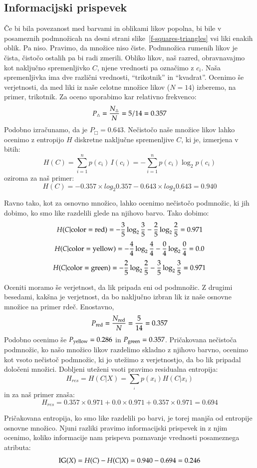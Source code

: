 \subsection{Informacijski prispevek}

Če bi bila povezanost med barvami in oblikami likov popolna, bi bile v posameznih podmnožicah na desni strani slike~\ref{f-squares-triangles} vsi liki enakih oblik. Pa niso. Pravimo, da množice niso čiste. Podmnožica rumenih likov je čista, čistočo ostalih pa bi radi zmerili. Obliko likov, naš razred, obravnavajmo kot naključno spremenljivko $C$, njene vrednosti pa označimo z $c_i$. Naša spremenljivka ima dve različni vrednosti, ``trikotnik'' in ``kvadrat''. Ocenimo še verjetnosti, da med liki iz naše celotne množice likov ($N=14$) izberemo, na primer, trikotnik. Za oceno uporabimo kar relativno frekvenco:
%
$$ P_{\triangle}={N_{\triangle} \over N} = 5/14 = 0.357 $$
%
Podobno izračunamo, da je $P_{\Box}= 0.643$. Nečistočo naše množice likov lahko ocenimo z entropijo $H$ diskretne naključne spremenljive $C$, ki je, izmerjena v bitih:
%
$$ H(C) = \sum_{i=1}^n {p(c_i)\,I(c_i)} = -\sum_{i=1}^n {p(c_i) \log_2 p(c_i)} $$
%
oziroma za naš primer:
$$ H(C) = - 0.357 \times log_2 0.357 - 0.643 \times log_2 0.643 = 0.940 $$

Ravno tako, kot za osnovno množico, lahko ocenimo nečistočo podmnožic, ki jih dobimo, ko smo like razdelili glede na njihovo barvo. Tako dobimo:
%
$$ H(C|{\rm color=red}) = -{3\over 5}\log_2{3\over 5}-{2\over 5}\log_2{2\over 5}=0.971 $$
$$ H(C|{\rm color=yellow}) = -{4\over 4}\log_2{4\over 4}-{0\over 4}\log_2{0\over 4}=0.0 $$
$$ H(C|{\rm color=green}) = -{2\over 5}\log_2{2\over 5}-{3\over 5}\log_2{3\over 5}=0.971 $$

Oceniti moramo še verjetnost, da lik pripada eni od podmnožic. Z drugimi besedami, kakšna je verjetnost, da bo naključno izbran lik iz naše osnovne množice na primer rdeč. Enostavno, 
%
$$ P_{\rm red}={N_{\rm red}\over N} = {5\over 14}=0.357$$
%
Podobno ocenimo še $P_{\rm yellow}=0.286$ in $P_{\rm green}=0.357$. Pričakovana nečistoča podmnožic, ko našo množico likov razdelimo skladno z njihovo barvno, ocenimo kot vsoto nečistoč podmnožic, ki jo utežimo z verjetnostjo, da bo lik pripadal določeni množici. Dobljeni uteženi vsoti pravimo residualna entropija:
%
$$ H_{res}=H(C|X)=\sum_{_i} p(x_i) H(C|x_i)  $$
%
in za naš primer znaša:
$$ H_{res} = 0.357 \times 0.971 + 0.0 \times 0.971 + 0.357 \times 0.971 = 0.694 $$

Pričakovana entropija, ko smo like razdelili po barvi, je torej manjša od entropije osnovne množico. Njuni razliki pravimo informacijski prispevek  in z njim ocenimo, koliko informacije nam prispeva poznavanje vrednosti posameznega atributa:
$$ {\rm IG}(X) = H(C) - H(C|X) = 0.940 - 0.694 = 0.246 $$

